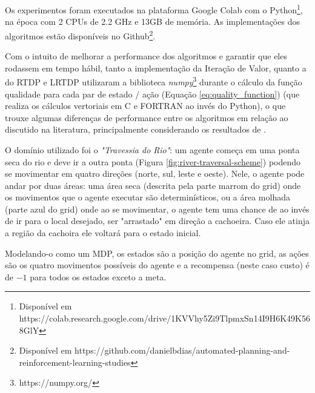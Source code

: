 \documentclass[letterpaper]{article}
\begin{document}
Os experimentos foram executados na plataforma Google Colab com o Python\footnote{Disponível em https://colab.research.google.com/drive/1KVVhy5Zi9TlpmxSn14I9H6K49K568GlY}, na época com 2 CPUs de 2.2 GHz e 13GB de memória. As implementações dos algoritmos estão disponíveis no Github\footnote{Disponível em https://github.com/danielbdias/automated-planning-and-reinforcement-learning-studies}.

Com o intuito de melhorar a performance dos algoritmos e garantir que eles rodassem em tempo hábil, tanto a implementação da Iteração de Valor, quanto a do RTDP e LRTDP utilizaram a biblioteca \emph{numpy}\footnote{https://numpy.org/} durante o cálculo da função qualidade para cada par de estado / ação (Equação \ref{eq:quality_function}) (que realiza os cálculos vertoriais em C e FORTRAN ao invés do Python), o que trouxe algumas diferenças de performance entre os algoritmos em relação ao discutido na literatura, principalmente considerando os resultados de \cite{BonetGeffer-2003}.

O domínio utilizado foi o \emph{"Travessia do Rio"}: um agente começa em uma ponta seca do rio e deve ir a outra ponta (Figura \ref{fig:river-traversal-scheme}) podendo se movimentar em quatro direções (norte, sul, leste e oeste). Nele, o agente pode andar por duas áreas: uma área seca (descrita pela parte marrom do grid) onde os movimentos que o agente executar são determinísticos, ou a área molhada (parte azul do grid) onde ao se movimentar, o agente tem uma chance de ao invés de ir para o local desejado, ser "arrastado" em direção a cachoeira. Caso ele atinja a região da cachoira ele voltará para o estado inicial.

Modelando-o como um MDP, os estados são a posição do agente no grid, as ações são os quatro movimentos possíveis do agente e a recompensa (neste caso custo) é de $-1$ para todos os estados exceto a meta.
\end{document}
